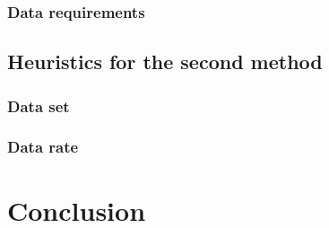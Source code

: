 \documentclass[twoside]{report}
\begin{document}
\subsection{Data requirements}

\section{Heuristics for the second method}
\subsection{Data set}
\subsection{Data rate}







\chapter{Conclusion}
\appendix


\end{document}
